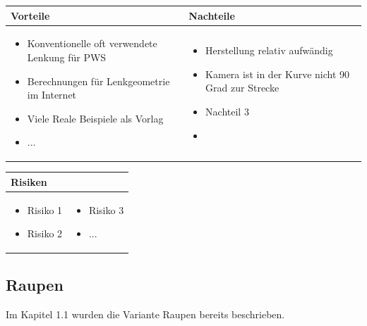 \begin{table}[h]
\begin{tabular}{p{} | p{}}


 \textbf{Vorteile} & \textbf{Nachteile} \\ \hline
	 
\begin{itemize}
\item Konventionelle oft verwendete Lenkung für PWS
\item Berechnungen für Lenkgeometrie im Internet
\item Viele Reale Beispiele als Vorlag
\item ...
\end{itemize}

 
 &
 
\begin{itemize}
\item Herstellung relativ aufwändig
\item Kamera ist in der Kurve nicht 90 Grad zur Strecke
\item Nachteil 3
\item 
\end{itemize}

\end{tabular}
\end{table}

\begin{table}[h]
\begin{tabular}{p{}p{}}


 \textbf{Risiken} & \\ \hline
	 
\begin{itemize}
\item Risiko 1
\item Risiko 2
\end{itemize}
&
\begin{itemize}
\item Risiko 3
\item ...
\end{itemize}

 
\end{tabular}
\end{table}

\pagebreak


\subsection{Raupen}
Im Kapitel 1.1 wurden die Variante Raupen bereits beschrieben.


